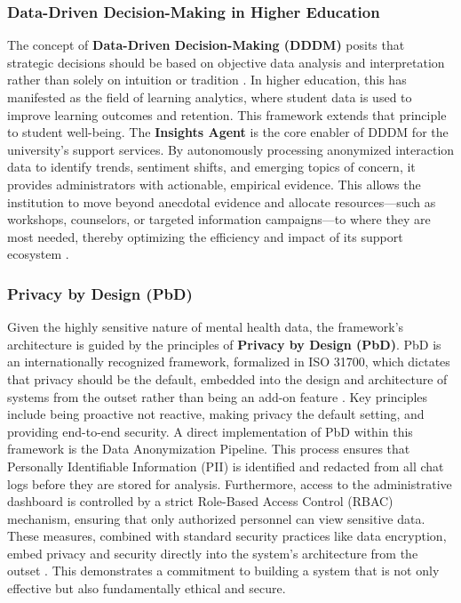 \subsubsection{Data-Driven Decision-Making in Higher Education}
The concept of \textbf{Data-Driven Decision-Making (DDDM)} posits that strategic decisions should be based on objective data analysis and interpretation rather than solely on intuition or tradition \cite{williams2022datadrivenhe, lyon2020datadrivenuniversity}. In higher education, this has manifested as the field of learning analytics, where student data is used to improve learning outcomes and retention. This framework extends that principle to student well-being. The \textbf{Insights Agent} is the core enabler of DDDM for the university's support services. By autonomously processing anonymized interaction data to identify trends, sentiment shifts, and emerging topics of concern, it provides administrators with actionable, empirical evidence. This allows the institution to move beyond anecdotal evidence and allocate resources—such as workshops, counselors, or targeted information campaigns—to where they are most needed, thereby optimizing the efficiency and impact of its support ecosystem \cite{popoola2025privacyawareframework}.

\subsubsection{Privacy by Design (PbD)}
Given the highly sensitive nature of mental health data, the framework's architecture is guided by the principles of \textbf{Privacy by Design (PbD)}. PbD is an internationally recognized framework, formalized in ISO 31700, which dictates that privacy should be the default, embedded into the design and architecture of systems from the outset rather than being an add-on feature \cite{guarda2024certificationsprivacy,atabey2024ethicsinedtech}. Key principles include being proactive not reactive, making privacy the default setting, and providing end-to-end security. A direct implementation of PbD within this framework is the Data Anonymization Pipeline. This process ensures that Personally Identifiable Information (PII) is identified and redacted from all chat logs before they are stored for analysis. Furthermore, access to the administrative dashboard is controlled by a strict Role-Based Access Control (RBAC) mechanism, ensuring that only authorized personnel can view sensitive data. These measures, combined with standard security practices like data encryption, embed privacy and security directly into the system's architecture from the outset \cite{popoola2025privacyawareframework, guarda2024certificationsprivacy}. This demonstrates a commitment to building a system that is not only effective but also fundamentally ethical and secure.

